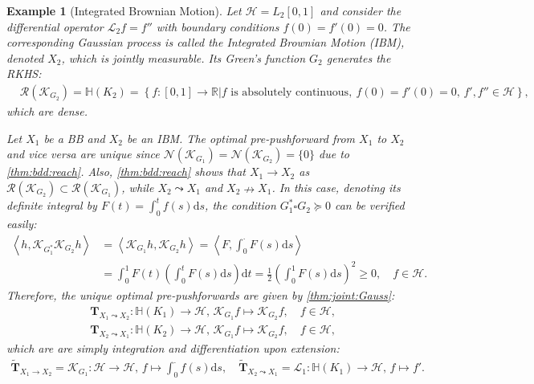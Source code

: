 \documentclass[noinfoline]{imsart}\setcounter{tocdepth}{2}
\renewcommand{\b}[1]{\mathbb{#1}} %
\newcommand{\m}[1]{\mathbf{#1}} %
\newcommand{\s}[1]{\mathscr{#1}} %
\renewcommand{\c}[1]{\mathcal{#1}} %
\newcommand{\innpr}[2]{{\left\langle {#1},{#2}\right\rangle}} %
\newcommand{\rd}{\mathrm{d}} %
\theoremstyle{plain}
\newtheorem{example}{Example}[section]
\begin{document}
\begin{example}[Integrated Brownian Motion]
Let $\c{H} = L_{2}[0,1]$ and consider the differential operator $\s{L}_{2} f = f ''$ with boundary conditions $f(0) = f'(0) = 0$. The corresponding Gaussian process is called the Integrated Brownian Motion (IBM), denoted $X_{2}$, which is jointly measurable. Its Green's function $G_{2}$ 
generates the RKHS:
\begin{align*}
    &\c{R}(\s{K}_{G_{2}}) =  \b{H}(K_{2}) = \left\{ f:[0, 1] \rightarrow \b{R} \left. \right\vert f \text{ is absolutely continuous}, \ f(0) = f'(0) = 0, \,  f', f'' \in \c{H} \right\},
\end{align*}
which are dense. 

Let $X_{1}$ be a BB and $X_{2}$ be an IBM. The optimal pre-pushforward from $X_{1}$ to $X_{2}$ and vice versa are unique since $\c{N}(\s{K}_{G_{1}}) = \c{N}(\s{K}_{G_{2}}) = \{0\}$ due to \cref{thm:bdd:reach}. Also, \cref{thm:bdd:reach} shows that $X_{1} \to X_{2}$ as $\c{R}(\s{K}_{G_{2}}) \subset \c{R}(\s{K}_{G_{1}})$, while $X_{2} \leadsto X_{1}$ and $X_{2} \nrightarrow X_{1}$. In this case, denoting its definite integral by $F(t) = \int_{0}^{t} f(s) \rd s$, the condition $G_{1}^{*} \square G_{2} \succeq 0$ can be verified easily:
\begin{align*}
    \innpr{h}{\s{K}_{G_{1}^{*}} \s{K}_{G_{2}} h} 
    &= \innpr{\s{K}_{G_{1}} h}{\s{K}_{G_{2}} h} = \innpr{F}{\int_{0}^{\cdot} F(s) \rd s} \\
    &= \int_{0}^{1} F(t) \left( \int_{0}^{t} F(s) \rd s  \right) \rd t = \frac{1}{2} \left( \int_{0}^{1} F(s) \rd s  \right)^{2} \ge 0, \quad f \in \c{H}.
\end{align*}
Therefore, the unique optimal pre-pushforwards are given by \cref{thm:joint:Gauss}:
\begin{align*}
    &\m{T}_{X_{1} \leadsto X_{2}}: \b{H}(K_{1}) \rightarrow \c{H}, \, \s{K}_{G_{1}} f \mapsto \s{K}_{G_{2}} f, \quad f \in \c{H}, \\
    &\m{T}_{X_{2} \leadsto X_{1}}: \b{H}(K_{2}) \rightarrow \c{H}, \, \s{K}_{G_{1}} f \mapsto \s{K}_{G_{2}} f, \quad f \in \c{H},
\end{align*}
which are are simply integration and differentiation upon extension:
\begin{align*}
    \tilde{\m{T}}_{X_{1} \to X_{2}} = \s{K}_{G_{1}}: \c{H} \rightarrow \c{H}, \, f \mapsto \int_{0}^{\cdot} f(s) \rd s, \quad
    \tilde{\m{T}}_{X_{2} \leadsto X_{1}} = \s{L}_{1}: \b{H}(K_{1}) \rightarrow \c{H}, \, f \mapsto f'.
\end{align*} 
\end{example}
\end{document}
